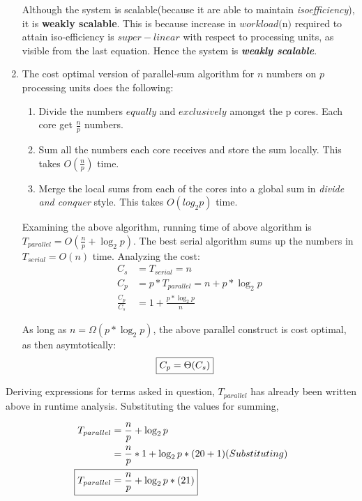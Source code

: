 \documentclass{article}
\newcommand{\bld}[1]{\textbf{#1}}
\newcommand{\ital}[1]{\textit{#1}}
\begin{document}
\begin{enumerate}[label=(\alph*)]
Although the system is scalable(because it are able to maintain \ital{isoefficiency}), it is \bld{weakly scalable}. This is because increase in $workload($n$)$ required to attain iso-efficiency is $super-linear$ with respect to processing units, as visible from the last equation. Hence the system is \bld{\ital{weakly scalable}}.

\item The cost optimal version of parallel-sum algorithm for $n$ numbers on $p$ processing units does the following:

\begin{enumerate}[label=(\roman*)]
\item Divide the numbers $equally$ and $exclusively$ amongst the p cores. Each core get $\frac{n}{p}$ numbers.
\item Sum all the numbers each core receives and store the sum locally. This takes $O(\frac{n}{p})$ time.
\item Merge the local sums from each of the cores into a global sum in \ital{divide and conquer} style. This takes $O(log_2 p)$ time.
\end{enumerate}  

Examining the above algorithm, running time of above algorithm is $T_{parallel}=O(\frac{n}{p} + \log_2 p)$. The best serial algorithm sums up the numbers in $T_{serial}=O(n)$ time. Analyzing the cost: 
\begin{align*}
C_{s} &=T_{serial}=n\\
C_{p} &=p*T_{parallel}=n+p*\log_2 p\\
\frac{C_{p}}{C_{s}} &=1+\frac{p*\log_2 p}{n}
\end{align*}

As long as $n=\Omega(p*\log_2 p)$, the above parallel construct is cost optimal, as then asymtotically:
\begin{align*}
\Aboxed{C_p &=\Theta(C_s)}
\end{align*}
\end{enumerate}

Deriving expressions for terms asked in question, $T_{parallel}$ has already been written above in runtime analysis. Substituting the values for summing,

\begin{align*}
T_{parallel} &=\frac{n}{p} + \log_2 p\\
  &= \frac{n}{p}*1 + \log_2 p*(20+1)(Substituting)\\
\Aboxed{T_{parallel} &= \frac{n}{p} + \log_2 p*(21)}
\end{align*}
\end{document}
